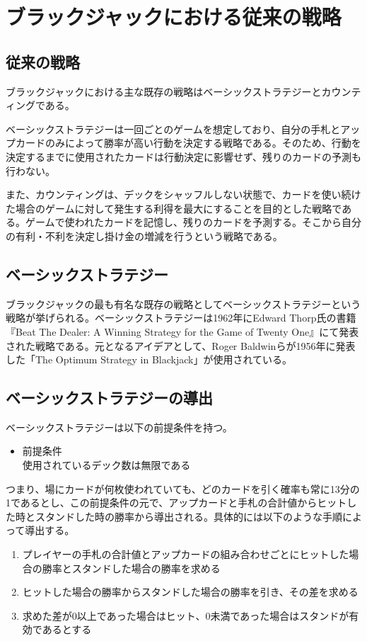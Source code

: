     \section{ブラックジャックにおける従来の戦略}
    \subsection{従来の戦略}

        ブラックジャックにおける主な既存の戦略はベーシックストラテジーとカウンティングである。

        ベーシックストラテジーは一回ごとのゲームを想定しており、自分の手札とアップカードのみによって勝率が高い行動を決定する戦略である。そのため、行動を決定するまでに使用されたカードは行動決定に影響せず、残りのカードの予測も行わない。

        また、カウンティングは、デックをシャッフルしない状態で、カードを使い続けた場合のゲームに対して発生する利得を最大にすることを目的とした戦略である。ゲームで使われたカードを記憶し、残りのカードを予測する。そこから自分の有利・不利を決定し掛け金の増減を行うという戦略である。
    \subsection{ベーシックストラテジー}
        ブラックジャックの最も有名な既存の戦略としてベーシックストラテジーという戦略が挙げられる。ベーシックストラテジーは1962年にEdward Thorp氏の書籍『Beat The Dealer: A Winning Strategy for the Game of Twenty One』にて発表された戦略である。元となるアイデアとして、Roger Baldwinらが1956年に発表した「The Optimum Strategy in Blackjack」が使用されている。
    \subsection{ベーシックストラテジーの導出}
        ベーシックストラテジーは以下の前提条件を持つ。
        \begin{itemize}
            \item 前提条件\\
                使用されているデック数は無限である
        \end{itemize}

        つまり、場にカードが何枚使われていても、どのカードを引く確率も常に13分の1であるとし、この前提条件の元で、アップカードと手札の合計値からヒットした時とスタンドした時の勝率から導出される。具体的には以下のような手順によって導出する。
        \begin{enumerate}
            \item プレイヤーの手札の合計値とアップカードの組み合わせごとにヒットした場合の勝率とスタンドした場合の勝率を求める
            \item ヒットした場合の勝率からスタンドした場合の勝率を引き、その差を求める
            \item 求めた差が0以上であった場合はヒット、0未満であった場合はスタンドが有効であるとする
        \end{enumerate}

